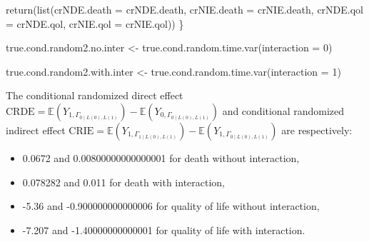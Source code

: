 \documentclass[
]{book}
\newenvironment{Shaded}{\begin{snugshade}}{\end{snugshade}}
\newcommand{\AttributeTok}[1]{\textcolor[rgb]{0.77,0.63,0.00}{#1}}
\newcommand{\DecValTok}[1]{\textcolor[rgb]{0.00,0.00,0.81}{#1}}
\newcommand{\FunctionTok}[1]{\textcolor[rgb]{0.00,0.00,0.00}{#1}}
\newcommand{\NormalTok}[1]{#1}
\newcommand{\OtherTok}[1]{\textcolor[rgb]{0.56,0.35,0.01}{#1}}
\providecommand{\tightlist}{%
  \setlength{\itemsep}{0pt}\setlength{\parskip}{0pt}}
\begin{document}
\begin{Shaded}
\begin{Highlighting}[]
  \FunctionTok{return}\NormalTok{(}\FunctionTok{list}\NormalTok{(}\AttributeTok{crNDE.death =}\NormalTok{ crNDE.death, }\AttributeTok{crNIE.death =}\NormalTok{ crNIE.death, }
              \AttributeTok{crNDE.qol =}\NormalTok{ crNDE.qol, }\AttributeTok{crNIE.qol =}\NormalTok{ crNIE.qol))}
\NormalTok{\}}
\end{Highlighting}
\end{Shaded}

\begin{Shaded}
\begin{Highlighting}[]
\NormalTok{true.cond.random2.no.inter }\OtherTok{\textless{}{-}} \FunctionTok{true.cond.random.time.var}\NormalTok{(}\AttributeTok{interaction =} \DecValTok{0}\NormalTok{)}

\NormalTok{true.cond.random2.with.inter }\OtherTok{\textless{}{-}} \FunctionTok{true.cond.random.time.var}\NormalTok{(}\AttributeTok{interaction =} \DecValTok{1}\NormalTok{)}
\end{Highlighting}
\end{Shaded}

The conditional randomized direct effect \(\text{CRDE}=\mathbb{E}\left(Y_{1,\Gamma_{0\mid L(0),L(1)}}\right) - \mathbb{E}\left(Y_{0,\Gamma_{0\mid L(0),L(1)}}\right)\) and conditional randomized indirect effect \(\text{CRIE}=\mathbb{E}\left(Y_{1,\Gamma_{1\mid L(0),L(1)}}\right) - \mathbb{E}\left(Y_{1,\Gamma_{0\mid L(0),L(1)}}\right)\) are respectively:

\begin{itemize}
\tightlist
\item
  0.0672 and 0.00800000000000001 for death without interaction,
\item
  0.078282 and 0.011 for death with interaction,
\item
  -5.36 and -0.900000000000006 for quality of life without interaction,
\item
  -7.207 and -1.40000000000001 for quality of life with interaction.
\end{itemize}
\end{document}
